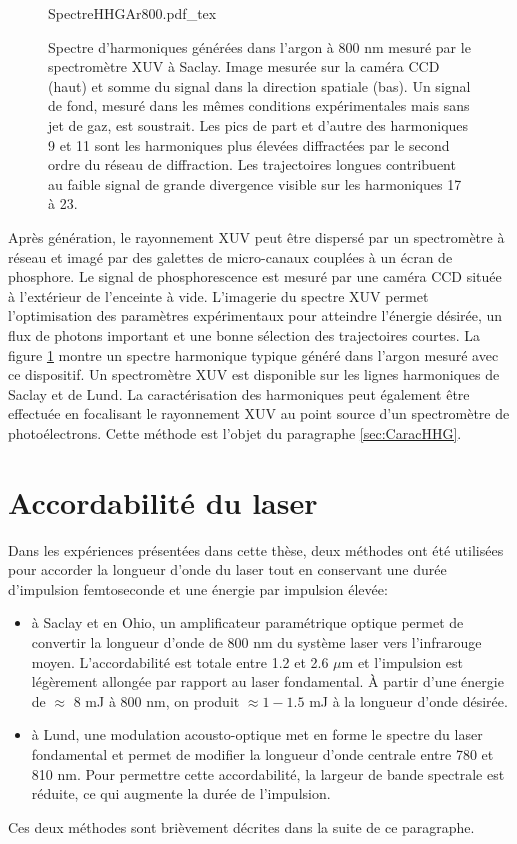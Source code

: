 \begin{figure}[ht]
\centering
\def\svgwidth{\columnwidth}
{SpectreHHGAr800.pdf_tex}
\caption{Spectre d'harmoniques générées dans l'argon à 800 nm mesuré par le spectromètre XUV à Saclay. Image mesurée sur la caméra CCD (haut) et somme du signal dans la direction spatiale (bas). Un signal de fond, mesuré dans les mêmes conditions expérimentales mais sans jet de gaz, est soustrait. Les pics de part et d'autre des harmoniques 9 et 11 sont les harmoniques plus élevées diffractées par le second ordre du réseau de diffraction. Les trajectoires longues contribuent au faible signal de grande divergence visible sur les harmoniques 17 à 23.}
\label{fig:SpectreAr800}
\end{figure}

Après génération, le rayonnement XUV peut être dispersé par un spectromètre à réseau et imagé par des galettes de micro-canaux couplées à un écran de phosphore. Le signal de phosphorescence est mesuré par une caméra CCD située à l'extérieur de l'enceinte à vide. L'imagerie du spectre XUV permet l'optimisation des paramètres expérimentaux pour atteindre l'énergie désirée, un flux de photons important et une bonne sélection des trajectoires courtes. La figure \ref{fig:SpectreAr800} montre un spectre harmonique typique généré dans l'argon mesuré avec ce dispositif. Un spectromètre XUV est disponible sur les lignes harmoniques de Saclay et de Lund. La caractérisation des harmoniques peut également être effectuée en focalisant le rayonnement XUV au point source d'un spectromètre de photoélectrons. Cette méthode est l'objet du paragraphe \ref{sec:CaracHHG}.




\section{Accordabilité du laser}
\label{sec:Accordabilité}
Dans les expériences présentées dans cette thèse, deux méthodes ont été utilisées pour accorder la longueur d'onde du laser tout en conservant une durée d'impulsion femtoseconde et une énergie par impulsion élevée:
\begin{itemize}[label=--,leftmargin=*]
\item à Saclay et en Ohio, un amplificateur paramétrique optique permet de convertir la longueur d'onde de 800 nm du système laser vers l'infrarouge moyen. L'accordabilité est totale entre 1.2 et 2.6 $\mu$m et l'impulsion est légèrement allongée par rapport au laser fondamental. \`{A} partir d'une énergie de $\approx$ 8 mJ à 800 nm, on produit $\approx 1 - 1.5$ mJ à la longueur d'onde désirée.
\item à Lund, une modulation acousto-optique met en forme le spectre du laser fondamental et permet de modifier la longueur d'onde centrale entre 780 et 810 nm. Pour permettre cette accordabilité, la largeur de bande spectrale est réduite, ce qui augmente la durée de l'impulsion.
\end{itemize}
Ces deux méthodes sont brièvement décrites dans la suite de ce paragraphe.
